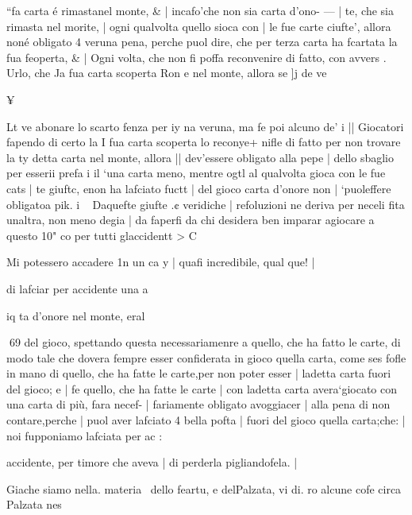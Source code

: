 \documentclass[11pt,a6paper]{article}
\begin{document}
“fa carta é rimastanel monte, & |
incafo'che non sia carta d’ono- — |
te, che sia rimasta nel morite, |
ogni qualvolta quello sioca con |
le fue carte ciufte’, allora noné
obligato 4 veruna pena, perche
puol dire, che per terza carta
ha fcartata la fua feoperta, & |
Ogni volta, che non fi poffa reconvenire di fatto, con avvers
. Urlo, che Ja fua carta scoperta
Ron e nel monte, allora se ]j de
ve

 

 

¥

 
 

Lt ve abonare lo scarto fenza per
iy na veruna, ma fe poi alcuno de’
i || Giocatori fapendo di certo la
I fua carta scoperta lo reconye+ nifle di fatto per non trovare la
ty detta carta nel monte, allora
|| dev’essere obligato alla pepe
| dello sbaglio per esserii prefa
i il ‘una carta meno, mentre ogtl
al qualvolta gioca con le fue cats
| te giuftc, enon ha lafciato fuctt
| del gioco carta d’onore non
| ‘puoleffere obligatoa pik.
i ~ Daquefte giufte .¢ veridiche
| refoluzioni ne deriva per neceli fita unaltra, non meno degia
| da faperfi da chi desidera ben
imparar agiocare a questo 10"
co per tutti glaccidentt > C

Mi potessero accadere 1n un ca y
| quafi incredibile, qual que!
|

 

 

di lafciar per accidente una a

iq ta d’onore nel monte, eral

 

 

 

 
69
del gioco, spettando questa necessariamenre a quello, che ha
fatto le carte, di modo tale che
dovera fempre esser confiderata
in gioco quella carta, come ses
fofle in mano di quello, che ha
fatte le carte,per non poter esser |
ladetta carta fuori del gioco; e |
fe quello, che ha fatte le carte |
con ladetta carta avera‘giocato
con una carta di più, fara necef- |
fariamente obligato avoggiacer |
alla pena di non contare,perche |
puol aver lafciato 4 bella pofta |
fuori del gioco quella carta;che: |
noi fupponiamo lafciata per ac
:

 

 

 

accidente, per timore che aveva |
di perderla pigliandofela. |

Giache siamo nella. materia \
dello feartu, e delPalzata, vi di.
ro alcune cofe circa Palzata nes
\end{document}

